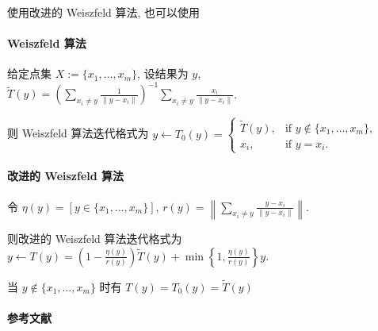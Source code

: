 使用改进的 Weiszfeld 算法, 也可以使用 

\paragraph{Weiszfeld 算法}

给定点集 \(X:=\{x_1,\dots,x_m\}\), 设结果为 \(y\), \(\displaystyle\tilde{T}(y)=\left(\sum_{x_i\neq y} \frac{1}{\lVert y-x_i\rVert}\right)^{-1}\sum_{x_i\neq y} \frac{x_i}{\lVert y-x_i\rVert}\).

则 Weiszfeld 算法迭代格式为 \(\displaystyle y\gets T_0(y)=\begin{cases}
    \tilde{T}(y), & \text{if } y\notin\{x_1,\dots,x_m\}, \\
    x_i,          & \text{if } y=x_i.
\end{cases}\)

\paragraph{改进的 Weiszfeld 算法}

令 \(\eta(y)=[y\in\{x_1,\dots,x_m\}]\), \(\displaystyle r(y)=\left\lVert\sum_{x_i\neq y} \frac{y-x_i}{\lVert y-x_i\rVert}\right\rVert\).

则改进的 Weiszfeld 算法迭代格式为 \(\displaystyle y\gets T(y)=\left(1-\frac{\eta(y)}{r(y)}\right)\tilde{T}(y)+\min\left\{1,\frac{\eta(y)}{r(y)}\right\}y\).

当 \(y\notin\{x_1,\dots,x_m\}\) 时有 \(T(y)=T_0(y)=\tilde{T}(y)\)

\paragraph{参考文献} \cite{katz1974local} \cite{brimberg1992local} \cite{vardi2000multivariate}